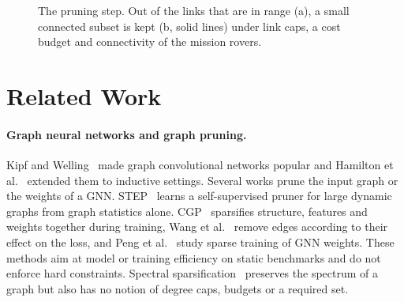 \documentclass[11pt]{article}
\begin{document}
\begin{figure}[t]
\centering
{}
\caption{The pruning step. Out of the links that are in range (a), a small
connected subset is kept (b, solid lines) under link caps, a cost budget and
connectivity of the mission rovers.}
\label{fig:pruning}
\end{figure}

\section{Related Work}

\paragraph{Graph neural networks and graph pruning.}
Kipf and Welling~\cite{kipf2017} made graph convolutional networks popular
and Hamilton et al.~\cite{hamilton2017} extended them to inductive settings.
Several works prune the input graph or the weights of a GNN. STEP~\cite{li2023step}
learns a self-supervised pruner for large dynamic graphs from graph
statistics alone. CGP~\cite{liu2024cgp} sparsifies structure, features and
weights together during training, Wang et al.~\cite{wang2022} remove edges
according to their effect on the loss, and Peng et al.~\cite{peng2022} study
sparse training of GNN weights. These methods aim at model or training
efficiency on static benchmarks and do not enforce hard constraints. Spectral
sparsification~\cite{spielman2011} preserves the spectrum of a graph but also
has no notion of degree caps, budgets or a required set.
\end{document}
